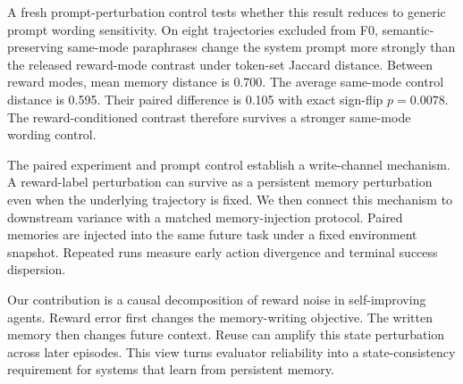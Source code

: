 A fresh prompt-perturbation control tests whether this result reduces to generic prompt wording sensitivity. On eight trajectories excluded from F0, semantic-preserving same-mode paraphrases change the system prompt more strongly than the released reward-mode contrast under token-set Jaccard distance. Between reward modes, mean memory distance is 0.700. The average same-mode control distance is 0.595. Their paired difference is 0.105 with exact sign-flip $p=0.0078$. The reward-conditioned contrast therefore survives a stronger same-mode wording control.

The paired experiment and prompt control establish a write-channel mechanism. A reward-label perturbation can survive as a persistent memory perturbation even when the underlying trajectory is fixed. We then connect this mechanism to downstream variance with a matched memory-injection protocol. Paired memories are injected into the same future task under a fixed environment snapshot. Repeated runs measure early action divergence and terminal success dispersion.

Our contribution is a causal decomposition of reward noise in self-improving agents. Reward error first changes the memory-writing objective. The written memory then changes future context. Reuse can amplify this state perturbation across later episodes. This view turns evaluator reliability into a state-consistency requirement for systems that learn from persistent memory.
